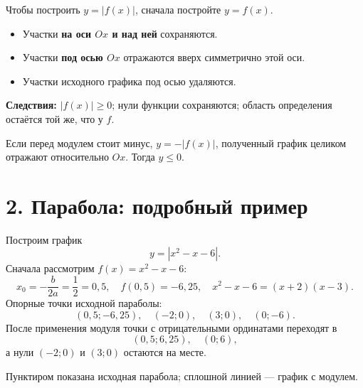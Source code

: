 \documentclass[a4paper,12pt]{article}
\newcommand{\accentsection}[1]{\section*{\color{darkaccent}#1}}
\begin{document}
Чтобы построить $y=|f(x)|$, сначала постройте $y=f(x)$.
\begin{itemize}
\item Участки \textbf{на оси $Ox$ и над ней} сохраняются.
\item Участки \textbf{под осью $Ox$} отражаются вверх симметрично этой оси.
\item Участки исходного графика под осью удаляются.
\end{itemize}

\textbf{Следствия:} $|f(x)|\ge0$; нули функции сохраняются; область определения остаётся той же, что у $f$.

Если перед модулем стоит минус, $y=-|f(x)|$, полученный график целиком отражают относительно $Ox$. Тогда $y\le0$.

\accentsection{2. Парабола: подробный пример}
Построим график
\[
y=|x^2-x-6|.
\]
Сначала рассмотрим $f(x)=x^2-x-6$:
\[
x_0=-\frac{b}{2a}=\frac12=0{,}5,
\quad f(0{,}5)=-6{,}25,
\quad x^2-x-6=(x+2)(x-3).
\]
Опорные точки исходной параболы:
\[
(0{,}5;-6{,}25),\quad(-2;0),\quad(3;0),\quad(0;-6).
\]
После применения модуля точки с отрицательными ординатами переходят в
\[
(0{,}5;6{,}25),\quad(0;6),
\]
а нули $(-2;0)$ и $(3;0)$ остаются на месте.

\begin{center}
\end{center}
\textcolor{softgray}{\small Пунктиром показана исходная парабола; сплошной линией --- график с модулем.}
\end{document}
